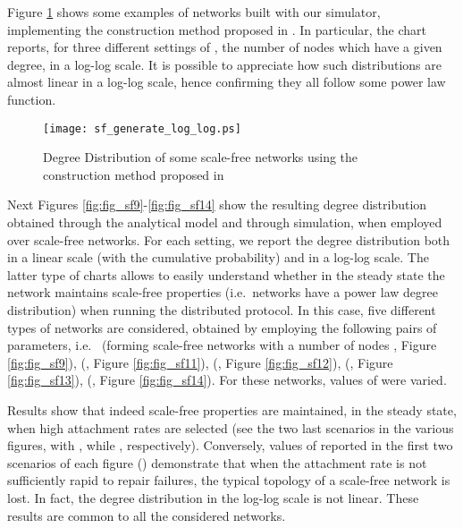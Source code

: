 \documentclass[a4paper,twosided]{article}
\begin{document}
Figure \ref{fig:fig_rete_Aiello} shows some examples of networks built with our simulator, implementing the construction method proposed in \cite{Aiello00arandom}. In particular, the chart reports, for three different settings of , the number of nodes which have a given degree, in a log-log scale. It is possible to appreciate how such distributions are almost linear in a log-log scale, hence confirming they all follow some power law function.

\begin{figure}
   \centering
   \texttt{[image: sf\_generate\_log\_log.ps]}
   \caption{Degree Distribution of some scale-free networks using the construction method proposed in \cite{Aiello00arandom}}
   \label{fig:fig_rete_Aiello}
\end{figure}

Next Figures \ref{fig:fig_sf9}-\ref{fig:fig_sf14} show the resulting degree distribution obtained through the analytical model and through simulation, when employed over scale-free networks. For each setting, we report the degree distribution both in a linear scale (with the cumulative probability) and in a log-log scale. The latter type of charts allows to easily understand whether in the steady state the network maintains scale-free properties (i.e.~networks have a power law degree distribution) when running the distributed protocol.
In this case, five different types of networks are considered, obtained by employing the following pairs of parameters, i.e.~ (forming scale-free networks with a number of nodes , Figure \ref{fig:fig_sf9}),  (, Figure \ref{fig:fig_sf11}),  (, Figure \ref{fig:fig_sf12}),  (, Figure \ref{fig:fig_sf13}),  (, Figure \ref{fig:fig_sf14}).
For these networks, values of  were varied.

Results show that indeed scale-free properties are maintained, in the steady state, when high attachment rates are selected
(see the two last scenarios in the various figures, with , while , respectively). Conversely, values of  reported in the first two scenarios of each figure () demonstrate that when the attachment rate is not sufficiently rapid to repair failures, the typical topology of a scale-free network is lost. In fact, the degree distribution in the log-log scale is not linear. These results are common to all the considered networks.
\end{document}
